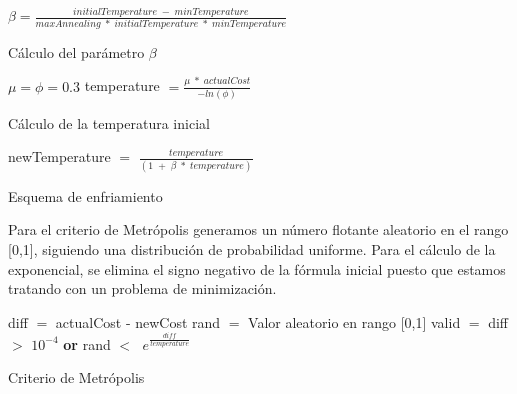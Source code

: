 
\begin{algorithm}[H]
    \SetAlgoLined
        $\beta = \frac{initialTemperature\;-\;minTemperature}{maxAnnealing\;*\;initialTemperature\;*\;minTemperature}$ \;
    \Return{$\beta$}
    \caption{Cálculo del parámetro $\beta$}
\end{algorithm}

\vspace{\baselineskip}

\begin{algorithm}[H]
    \SetAlgoLined
        $\mu = \phi = 0.3$ \;
        temperature $= \frac{\mu\;*\;actualCost}{- ln(\phi)}$ \;
    \caption{Cálculo de la temperatura inicial}
\end{algorithm}

\vspace{\baselineskip}

\begin{algorithm}[H]
    \SetAlgoLined
        newTemperature $=$ $\frac{temperature}{(1\;+\;\beta\;*\;temperature)}$ \;
    \caption{Esquema de enfriamiento}
\end{algorithm}

\vspace{\baselineskip}

Para el criterio de Metrópolis generamos un número flotante aleatorio en el rango [0,1], siguiendo una distribución de probabilidad uniforme. Para el cálculo de la exponencial, se elimina el signo negativo de la fórmula inicial puesto que estamos tratando con un problema de minimización.

\vspace{\baselineskip}

\begin{algorithm}[H]
    \SetAlgoLined
        diff $=$ actualCost - newCost \;
        rand $=$ Valor aleatorio en rango [0,1] \;
        valid $=$ diff $>$ $10^{-4}$ \textbf{or} rand $<$ $\;e^{\frac{diff}{temperature}}$ \;
    \caption{Criterio de Metrópolis}
\end{algorithm}

